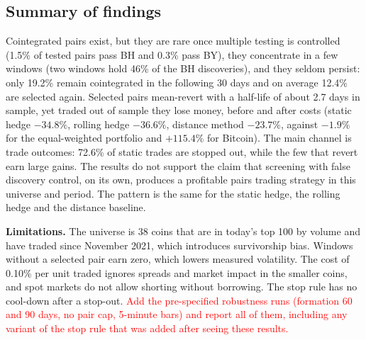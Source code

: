 \documentclass[10pt,a4paper,twocolumn]{article}
\newcommand{\TBD}[1]{\textcolor{red}{#1}}
\begin{document}
\subsection{Summary of findings}
Cointegrated pairs exist, but they are rare once multiple testing is controlled (1.5\% of tested pairs pass BH and 0.3\% pass BY), they concentrate in a few windows (two windows hold 46\% of the BH discoveries), and they seldom persist: only 19.2\% remain cointegrated in the following 30 days and on average 12.4\% are selected again. Selected pairs mean-revert with a half-life of about 2.7 days in sample, yet traded out of sample they lose money, before and after costs (static hedge $-34.8\%$, rolling hedge $-36.6\%$, distance method $-23.7\%$, against $-1.9\%$ for the equal-weighted portfolio and $+115.4\%$ for Bitcoin). The main channel is trade outcomes: 72.6\% of static trades are stopped out, while the few that revert earn large gains. The results do not support the claim that screening with false discovery control, on its own, produces a profitable pairs trading strategy in this universe and period. The pattern is the same for the static hedge, the rolling hedge and the distance baseline.

\textbf{Limitations.} The universe is 38 coins that are in today's top 100 by volume and have traded since November 2021, which introduces survivorship bias. Windows without a selected pair earn zero, which lowers measured volatility. The cost of 0.10\% per unit traded ignores spreads and market impact in the smaller coins, and spot markets do not allow shorting without borrowing. The stop rule has no cool-down after a stop-out. \TBD{Add the pre-specified robustness runs (formation 60 and 90 days, no pair cap, 5-minute bars) and report all of them, including any variant of the stop rule that was added after seeing these results.}



















\end{document}
